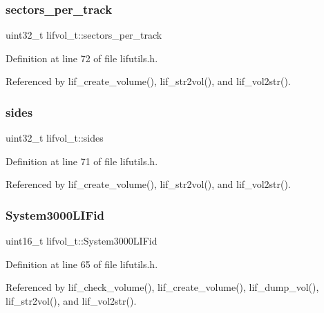 \subsubsection{\texorpdfstring{sectors\+\_\+per\+\_\+track}{sectors\_per\_track}}
{\footnotesize\ttfamily uint32\+\_\+t lifvol\+\_\+t\+::sectors\+\_\+per\+\_\+track}



Definition at line 72 of file lifutils.\+h.



Referenced by lif\+\_\+create\+\_\+volume(), lif\+\_\+str2vol(), and lif\+\_\+vol2str().

\mbox{\label{structlifvol__t_a5b8ecfb441b010f69cb90b923cc50719}} 
\subsubsection{\texorpdfstring{sides}{sides}}
{\footnotesize\ttfamily uint32\+\_\+t lifvol\+\_\+t\+::sides}



Definition at line 71 of file lifutils.\+h.



Referenced by lif\+\_\+create\+\_\+volume(), lif\+\_\+str2vol(), and lif\+\_\+vol2str().

\mbox{\label{structlifvol__t_a98097f8c951448cbab6019b7b703e4d0}} 
\subsubsection{\texorpdfstring{System3000\+L\+I\+Fid}{System3000LIFid}}
{\footnotesize\ttfamily uint16\+\_\+t lifvol\+\_\+t\+::\+System3000\+L\+I\+Fid}



Definition at line 65 of file lifutils.\+h.



Referenced by lif\+\_\+check\+\_\+volume(), lif\+\_\+create\+\_\+volume(), lif\+\_\+dump\+\_\+vol(), lif\+\_\+str2vol(), and lif\+\_\+vol2str().

\mbox{\label{structlifvol__t_aae9e5135f98b80312eb785ac3747fc31}} 
